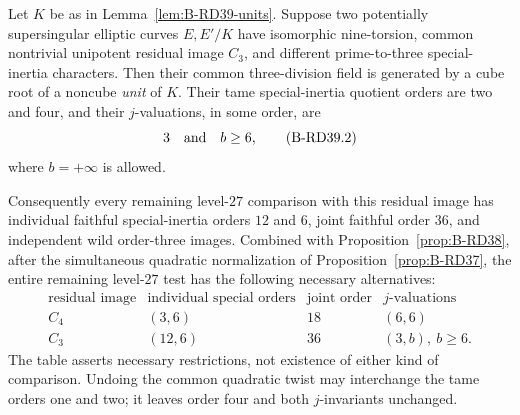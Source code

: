 \begin{proposition}
\label{prop:B-RD39}
Let $K$ be as in Lemma~\ref{lem:B-RD39-units}. Suppose two potentially
supersingular elliptic curves $E,E'/K$ have isomorphic nine-torsion,
common nontrivial unipotent residual image $C_3$, and different
prime-to-three special-inertia characters. Then their common
three-division field is generated by a cube root of a noncube
\emph{unit} of $K$. Their tame special-inertia quotient orders are
two and four, and their $j$-valuations, in some order, are
\[
                            3\quad\hbox{and}\quad b\ge6,
                                                        \tag{B-RD39.2}
\]
where $b=+\infty$ is allowed.

Consequently every remaining level-$27$ comparison with this residual
image has individual faithful special-inertia orders $12$ and $6$,
joint faithful order $36$, and independent wild order-three images.
Combined with Proposition~\ref{prop:B-RD38}, after the simultaneous
quadratic normalization of Proposition~\ref{prop:B-RD37}, the entire
remaining level-$27$ test has the following necessary alternatives:
\[
\begin{array}{c|c|c|c}
\text{residual image}&\text{individual special orders}&
 \text{joint order}&\text{$j$-valuations}\\\hline
C_4&(3,6)&18&(6,6)\\
C_3&(12,6)&36&(3,b),\ b\ge6.
\end{array}                                             \tag{B-RD39.3}
\]
The table asserts necessary restrictions, not existence of either kind
of comparison. Undoing the common quadratic twist may interchange
the tame orders one and two; it leaves order four and both
$j$-invariants unchanged.
\end{proposition}
